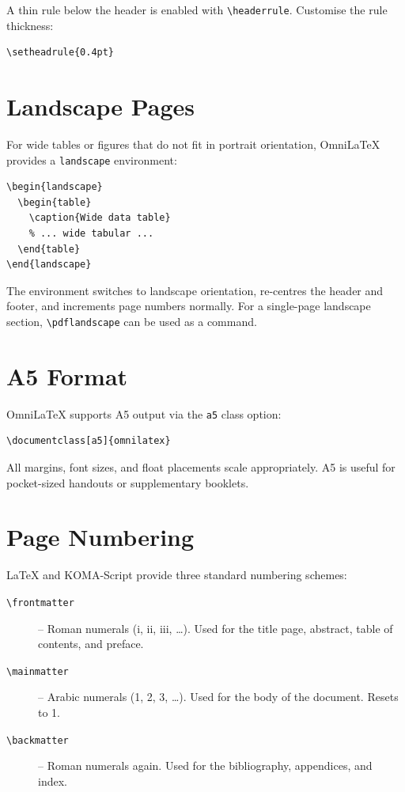 A thin rule below the header is enabled with \verb|\headerrule|.  Customise
the rule thickness:

\begin{verbatim}
\setheadrule{0.4pt}
\end{verbatim}

\section{Landscape Pages}

For wide tables or figures that do not fit in portrait orientation,
OmniLaTeX provides a \texttt{landscape} environment:

\begin{verbatim}
\begin{landscape}
  \begin{table}
    \caption{Wide data table}
    % ... wide tabular ...
  \end{table}
\end{landscape}
\end{verbatim}

The environment switches to landscape orientation, re-centres the header
and footer, and increments page numbers normally.  For a single-page
landscape section, \verb|\pdflandscape| can be used as a command.

\section{A5 Format}

OmniLaTeX supports A5 output via the \texttt{a5} class option:

\begin{verbatim}
\documentclass[a5]{omnilatex}
\end{verbatim}

All margins, font sizes, and float placements scale appropriately.  A5
is useful for pocket-sized handouts or supplementary booklets.

\section{Page Numbering}

LaTeX and KOMA-Script provide three standard numbering schemes:

\begin{description}
  \item[{\texttt{\textbackslash frontmatter}}] -- Roman numerals (i, ii, iii, \ldots).
        Used for the title page, abstract, table of contents, and preface.
  \item[{\texttt{\textbackslash mainmatter}}] -- Arabic numerals (1, 2, 3, \ldots).
        Used for the body of the document.  Resets to 1.
  \item[{\texttt{\textbackslash backmatter}}] -- Roman numerals again.
        Used for the bibliography, appendices, and index.
\end{description}

